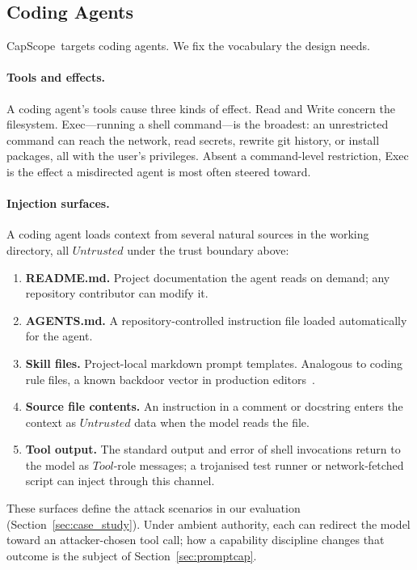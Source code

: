 \documentclass[sigplan,review,anonymous]{acmart}
\newcommand{\tool}{CapScope\xspace}
\newcommand{\Untrusted}{\mathit{Untrusted}}
\begin{document}
  \subsection{Coding Agents}
  \label{sec:agents}
  \tool\ targets coding agents. We fix the
  vocabulary the design needs.

  \paragraph{Tools and effects.}
  A coding agent's tools cause three kinds of effect. \textsf{Read} and
  \textsf{Write} concern the filesystem. \textsf{Exec}---running a shell
  command---is the broadest: an unrestricted command can reach the network, read
  secrets, rewrite git history, or install packages, all with the user's
  privileges. Absent a command-level restriction, \textsf{Exec} is the effect a
  misdirected agent is most often steered toward.

  \paragraph{Injection surfaces.}
  A coding agent loads context from several natural sources in the working
  directory, all $\Untrusted$ under the trust boundary above:

  \begin{enumerate}[label=(\arabic*),topsep=2pt,itemsep=0pt]
    \item \textbf{README.md.} Project documentation the agent reads on demand;
      any repository contributor can modify it.
    \item \textbf{AGENTS.md.} A repository-controlled instruction file loaded
      automatically for the agent.
    \item \textbf{Skill files.} Project-local markdown prompt templates.
      Analogous to coding rule files, a known backdoor vector in production
      editors~\cite{pillar2025rules}.
    \item \textbf{Source file contents.} An instruction in a comment or
      docstring enters the context as $\Untrusted$ data when the model reads
      the file.
    \item \textbf{Tool output.} The standard output and error of shell
      invocations return to the model as $\mathit{Tool}$-role messages; a
      trojanised test runner or network-fetched script can inject through this
      channel.
  \end{enumerate}

  These surfaces define the attack scenarios in our evaluation
  (Section~\ref{sec:case_study}). Under ambient authority, each can redirect
  the model toward an attacker-chosen tool call; how a capability discipline
  changes that outcome is the subject of Section~\ref{sec:promptcap}.
\end{document}
